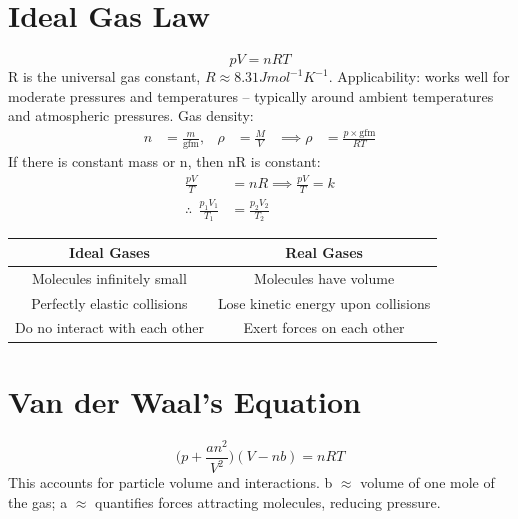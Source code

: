 \documentclass[a4paper, 11pt, normalem]{report}
\begin{document}
\section{Ideal Gas Law}
\begin{equation}
	pV = nRT
\end{equation}
R is the universal gas constant, $R \approx 8.31 J mol^{-1} K^{-1}$.
Applicability: works well for moderate pressures and temperatures -- typically around ambient temperatures and atmospheric pressures.
Gas density:
\begin{align}
    n &= \frac{m}{\text{gfm}}, & \rho &= \frac{M}{V} & \implies \rho &= \frac{p\times\text{gfm}}{RT}
\end{align}
If there is constant mass or n, then nR is constant:
\begin{align}
    \frac{pV}{T} &= nR \implies \frac{pV}{T} = k \\
    \therefore ~~\frac{p_{1}V_{1}}{T_{1}} &= \frac{p_{2}V_{2}}{T_{2}}
\end{align}
\begin{table}[H]
    \centering
    \begin{tabular}{c|c}
    	\hline\hline
    	\bfseries Ideal Gases &\bfseries Real Gases \\
    	\hline\hline
    	Molecules infinitely small & Molecules have volume \\
    	Perfectly elastic collisions & Lose kinetic energy upon collisions \\
    	Do no interact with each other & Exert forces on each other\\
    	\hline\hline
    \end{tabular}
\end{table}

\section{Van der Waal's Equation}
\begin{equation}
	\Big(p+\frac{an^{2}}{V^{2}}\Big)(V-nb) = nRT
\end{equation}
This accounts for particle volume and interactions.
b $\approx$ volume of one mole of the gas;
a $\approx$ quantifies forces attracting molecules, reducing pressure.
\end{document}
